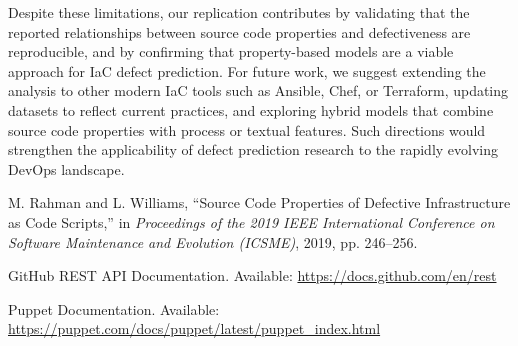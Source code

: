 \documentclass[conference]{IEEEtran}
\begin{document}
	Despite these limitations, our replication contributes by validating that the reported relationships between source code properties and defectiveness are reproducible, and by confirming that property-based models are a viable approach for IaC defect prediction. 
	For future work, we suggest extending the analysis to other modern IaC tools such as Ansible, Chef, or Terraform, updating datasets to reflect current practices, and exploring hybrid models that combine source code properties with process or textual features. 
	Such directions would strengthen the applicability of defect prediction research to the rapidly evolving DevOps landscape.
	

	
	\begin{thebibliography}{00}
		
		M. Rahman and L. Williams, ``Source Code Properties of Defective Infrastructure as Code Scripts,'' 
		in \textit{Proceedings of the 2019 IEEE International Conference on Software Maintenance and Evolution (ICSME)}, 
		2019, pp. 246--256.
		
		GitHub REST API Documentation. Available: \url{https://docs.github.com/en/rest}
		
		Puppet Documentation. Available: \url{https://puppet.com/docs/puppet/latest/puppet\_index.html}
		
	\end{thebibliography}
	
\end{document}
